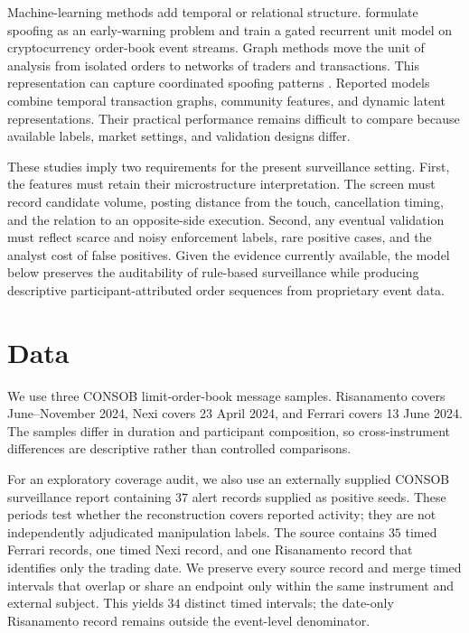 \documentclass[11pt]{article}
\begin{document}
Machine-learning methods add temporal or relational structure. \cite{TuccellaNadlerSerban2021} formulate spoofing as an
early-warning problem and train a gated recurrent unit model on cryptocurrency order-book event streams. Graph methods move
the unit of analysis from isolated orders to networks of traders and transactions. This representation can
capture coordinated spoofing patterns \cite{KangMuNing2023,KangMuNing2024,XiangEtAl2025}. Reported models combine
temporal transaction graphs, community features, and dynamic latent representations. Their practical performance remains
difficult to compare because available labels, market settings, and validation designs differ.

These studies imply two requirements for the present surveillance setting. First, the features must retain their
microstructure interpretation. The screen must record candidate volume, posting distance from the touch, cancellation
timing, and the relation to an opposite-side execution. Second, any eventual validation must reflect scarce and noisy
enforcement labels, rare positive cases, and the analyst cost of false positives. Given the evidence currently available,
the model below preserves the auditability of rule-based surveillance while producing descriptive participant-attributed
order sequences from proprietary event data.

\section{Data}
\label{sec:data}

We use three CONSOB limit-order-book message samples. Risanamento covers June--November 2024, Nexi covers 23 April 2024,
and Ferrari covers 13 June 2024. The samples differ in duration and participant composition, so cross-instrument differences
are descriptive rather than controlled comparisons.

For an exploratory coverage audit, we also use an externally supplied CONSOB surveillance report containing $37$ alert
records supplied as positive seeds. These periods test whether the reconstruction covers reported activity; they are not
independently adjudicated manipulation labels. The source contains $35$ timed Ferrari records, one timed Nexi record, and
one Risanamento record that identifies only the trading date. We preserve every source record and merge timed intervals that
overlap or share an endpoint only within the same instrument and external subject. This yields $34$ distinct timed intervals;
the date-only Risanamento record remains outside the event-level denominator.
\end{document}
